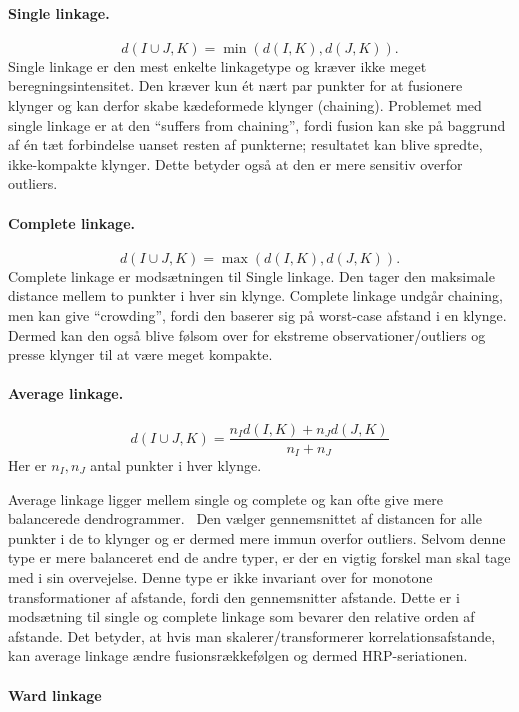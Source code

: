 \documentclass[../main.tex]{subfiles}
\begin{document}
\paragraph{Single linkage.}
\[
    d(I \cup J,K)=\min(d(I,K),d(J,K)).
\]
Single linkage er den mest enkelte linkagetype og kræver ikke meget beregningsintensitet. Den kræver kun ét nært par punkter for at fusionere klynger og kan derfor skabe kædeformede klynger (chaining). Problemet med single linkage er at den ``suffers from chaining'', fordi fusion kan ske på baggrund af én tæt forbindelse uanset resten af punkterne; resultatet kan blive spredte, ikke-kompakte klynger. Dette betyder også at den er mere sensitiv overfor outliers.~\cite{tibshirani_hierarchical_2013}

\paragraph{Complete linkage.}
\[
    d(I \cup J,K)=\max(d(I,K),d(J,K)).
\]
Complete linkage er modsætningen til Single linkage. Den tager den maksimale distance mellem to punkter i hver sin klynge. Complete linkage undgår chaining, men kan give ``crowding'', fordi den baserer sig på worst-case afstand i en klynge. Dermed kan den også blive følsom over for ekstreme observationer/outliers og presse klynger til at være meget kompakte.~\cite{tibshirani_hierarchical_2013}

\paragraph{Average linkage.}
\[
    d(I \cup J,K)=\frac{n_I d(I,K)+n_J d(J,K)}{n_I+n_J}
\]
Her er $n_I,n_J$ antal punkter i hver klynge.

Average linkage ligger mellem single og complete og kan ofte give mere balancerede dendrogrammer.~\cite{mullner_modern_2011} Den vælger gennemsnittet af distancen for alle punkter i de to klynger og er dermed mere immun overfor outliers. Selvom denne type er mere balanceret end de andre typer, er der en vigtig forskel man skal tage med i sin overvejelse. Denne type er ikke invariant over for monotone transformationer af afstande, fordi den gennemsnitter afstande. Dette er i modsætning til single og complete linkage som bevarer den relative orden af afstande. Det betyder, at hvis man skalerer/transformerer korrelationsafstande, kan average linkage ændre fusionsrækkefølgen og dermed HRP-seriationen.~\cite{kaae_karppinen_hierarchical_2022}

\paragraph{Ward linkage}
\end{document}
